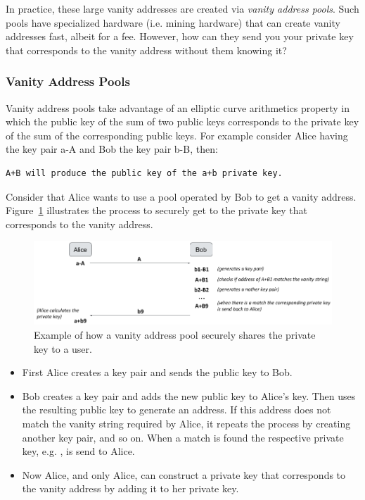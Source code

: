 In practice, these large vanity addresses are created via \emph{vanity address pools}. Such pools have specialized hardware (i.e. mining hardware) that can create vanity addresses fast, albeit for a fee. However, how can they send you your private key that corresponds to the vanity address without them knowing it?

\subsubsection*{Vanity Address Pools}
Vanity address pools take advantage of an elliptic curve arithmetics property in which the public key of the sum of two public keys corresponds to the private key of the sum of the corresponding public keys. For example consider Alice having the key pair a-A and Bob the key pair b-B, then:

\begin{emphbox}
\begin{lstlisting}[style=Pseudomath]
A+B will produce the public key of the a+b private key.
\end{lstlisting}
\end{emphbox}

Consider that Alice wants to use a pool operated by Bob to get a vanity address. Figure~\ref{fig:vanity-address-pools} illustrates the process to securely get to the private key that corresponds to the vanity address.

\begin{figure}[h]
\begin{center}
\includegraphics[scale=0.5]{images/vanity-address-pools}
\caption{Example of how a vanity address pool securely shares the private key to a user.}
\label{fig:vanity-address-pools}
\end{center}
\end{figure}

\begin{itemize}
\item First Alice creates a key pair and sends the public key  to Bob.
\item Bob creates a key pair and adds the new public key  to Alice's key. Then uses the resulting public key to generate an address. If this address does not match the vanity string required by Alice, it repeats the process by creating another key pair, and so on. When a match is found the respective private key, e.g. , is send to Alice.
\item Now Alice, and only Alice, can construct a private key that corresponds to the vanity address by adding it to her private key. 
\end{itemize}



